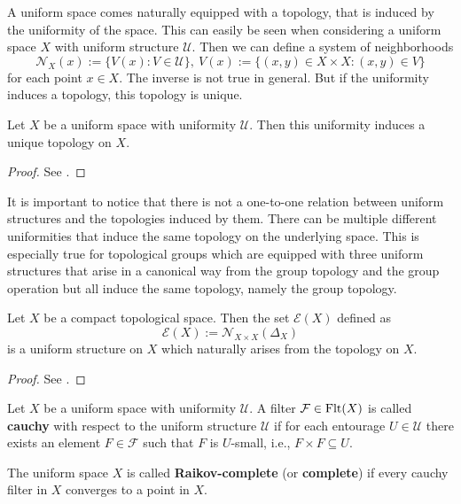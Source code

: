 A uniform space comes naturally equipped with a topology, that is induced by the uniformity of the space. This can easily be seen when considering a uniform space $X$ with uniform structure $\mathcal{U}$. Then we can define a system of neighborhoods $$ \mathcal{N}_X(x) := \{V(x)\colon V \in \mathcal{U}\}, \: V(x) := \{ (x,y) \in X \times X\colon (x,y) \in V\} $$ for each point $x \in X$. The inverse is not true in general. But if the uniformity induces a topology, this topology is unique.

\begin{thm}
  Let $X$ be a uniform space with uniformity $\mathcal{U}$. Then this uniformity induces a unique topology on $X$.
\end{thm}

\begin{proof}
  See \cite[Satz 11.5]{BvQMT}.
\end{proof}

It is important to notice that there is not a one-to-one relation between uniform structures and the topologies induced by them. There can be multiple different uniformities that induce the same topology on the underlying space. This is especially true for topological groups which are equipped with three uniform structures that arise in a canonical way from the group topology and the group operation but all induce the same topology, namely the group topology.

\begin{definthm}
  Let $X$ be a compact topological space. Then the set $\mathcal{E}(X)$ defined as $$ \mathcal{E}(X) := \mathcal{N}_{X\times X}(\Delta_X)$$ is a uniform structure on $X$ which naturally arises from the topology on $X$.
\end{definthm}

\begin{proof}
  See \cite[p. 199f.]{bour1998}.
\end{proof}

\begin{defin}
  Let $X$ be a uniform space with uniformity $\mathcal{U}$. A filter $\mathcal{F} \in {\rm Flt}(X)$ is called \textbf{cauchy} with respect to the uniform structure $\mathcal{U}$ if for each entourage $U \in \mathcal{U}$ there exists an element $F \in \mathcal{F}$ such that $F$ is $U$-small, i.e., $F \times F \subseteq U$.

  The uniform space $X$ is called \textbf{Raikov-complete} (or \textbf{complete}) if every cauchy filter in $X$ converges to a point in $X$.
\end{defin}

